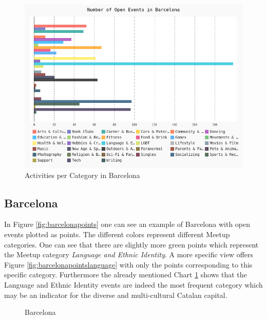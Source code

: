 \begin{figure}[!htp]
	\includegraphics[width=1\linewidth]{../plotting/pngs/categories/Barcelona.png}
	\caption{Activities per Category in Barcelona}\label{fig:barcelonabar}	
\end{figure}

\subsection*{Barcelona}

In Figure \ref{fig:barcelonapoints} one can see an example of Barcelona with open events plotted as points. The different colors represent different Meetup categories. One can see that there are slightly more green points which represent the Meetup category \emph{Language and Ethnic Identity}. A more specific view offers Figure \ref{fig:barcelonapointslanguage} with only the points corresponding to this specific category. Furthermore the already mentioned Chart \ref{fig:barcelonabar} shows that the Language and Ethnic Identity events are indeed the most frequent category which may be an indicator for the diverse and multi-cultural Catalan capital. 

\begin{figure}[!htp]
	\hfill
	\caption{Barcelona}\label{fig:barcelonamap}
\end{figure}

